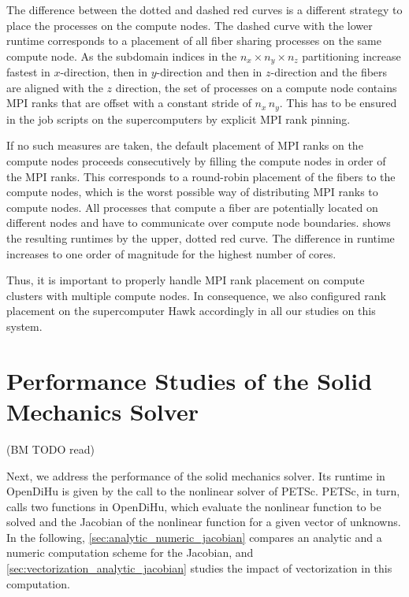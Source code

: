 The difference between the dotted and dashed red curves is a different strategy to place the processes on the compute nodes. The dashed curve with the lower runtime corresponds to a placement of all fiber sharing processes on the same compute node. As the subdomain indices in the $n_x \times n_y \times n_z$ partitioning increase fastest in $x$-direction, then in $y$-direction and then in $z$-direction and the fibers are aligned with the $z$ direction, the set of processes on a compute node contains MPI ranks that are offset with a constant stride of $n_x\,n_y$. This has to be ensured in the job scripts on the supercomputers by explicit MPI rank pinning.

If no such measures are taken, the default placement of MPI ranks on the compute nodes proceeds consecutively by filling the compute nodes in order of the MPI ranks. This corresponds to a round-robin placement of the fibers to the compute nodes, which is the worst possible way of distributing MPI ranks to compute nodes. All processes that compute a fiber are potentially located on different nodes and have to communicate over compute node boundaries.
 shows the resulting runtimes by the upper, dotted red curve. The difference in runtime increases to one order of magnitude for the highest number of cores.

Thus, it is important to properly handle MPI rank placement on compute clusters with multiple compute nodes. In consequence, we also configured rank placement on the supercomputer Hawk accordingly in all our studies on this system.



\section{Performance Studies of the Solid Mechanics Solver}\label{sec:performance_solid_mechanics}

(BM TODO read)

Next, we address the performance of the solid mechanics solver. 
Its runtime in OpenDiHu is given by the call to the nonlinear solver of PETSc. PETSc, in turn, calls two functions in OpenDiHu, which evaluate the nonlinear function to be solved and the Jacobian of the nonlinear function for a given vector of unknowns.
In the following, \cref{sec:analytic_numeric_jacobian} compares an analytic and a numeric computation scheme for the Jacobian, and \cref{sec:vectorization_analytic_jacobian} studies the impact of vectorization in this computation.

